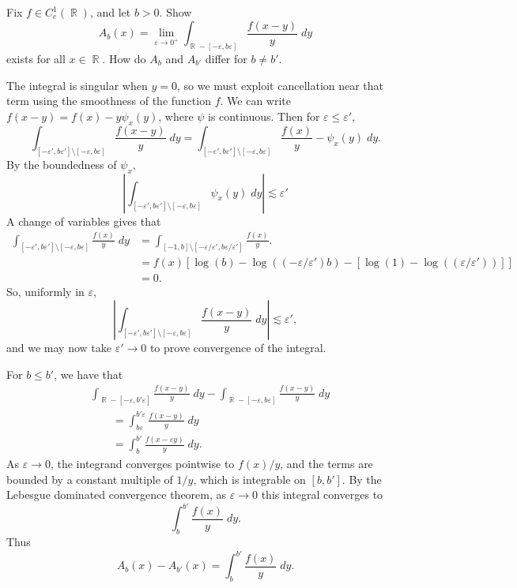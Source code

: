 \documentclass[answers]{exam}
\DeclareMathOperator{\RR}{\mathbb{R}}
\begin{document}
\begin{questions}
\question Fix $f \in C_c^1(\RR)$, and let $b > 0$. Show
%
\[ A_b(x) = \lim_{\varepsilon \to 0^+} \int_{\RR - [-\varepsilon,b\varepsilon]} \frac{f(x-y)}{y}\; dy \]
%
exists for all $x \in \RR$. How do $A_b$ and $A_{b'}$ differ for $b \neq b'$.
\begin{solution}
	The integral is singular when $y = 0$, so we must exploit cancellation near that term using the smoothness of the function $f$. We can write $f(x - y) = f(x) - y \psi_x(y)$, where $\psi$ is continuous. Then for $\varepsilon \leq \varepsilon'$,
	\[ \int_{[-\varepsilon',b \varepsilon'] \setminus [-\varepsilon,b \varepsilon]} \frac{f(x-y)}{y}\; dy = \int_{[-\varepsilon',b \varepsilon'] \setminus [-\varepsilon,b \varepsilon]} \frac{f(x)}{y} - \psi_x(y)\; dy. \]
	By the boundedness of $\psi_x$,
	\[ \left| \int_{[-\varepsilon',b \varepsilon'] \setminus [-\varepsilon,b \varepsilon]} \psi_x(y)\; dy \right| \lesssim \varepsilon' \]
	A change of variables gives that
	\begin{align*}
		\int_{[-\varepsilon',b \varepsilon'] \setminus [-\varepsilon,b \varepsilon]} \frac{f(x)}{y}\; dy &= \int_{[-1,b] \setminus [ -\varepsilon / \varepsilon', b \varepsilon / \varepsilon' ]} \frac{f(x)}{y}.\\
		&= f(x) [ \log(b) - \log( (-\varepsilon / \varepsilon') b ) - [\log(1) - \log((\varepsilon/\varepsilon'))] ]\\
		&= 0.
	\end{align*}
	So, uniformly in $\varepsilon$,
	\[ \left| \int_{[-\varepsilon',b \varepsilon'] \setminus [-\varepsilon,b \varepsilon]} \frac{f(x-y)}{y}\; dy \right| \lesssim \varepsilon', \]
	and we may now take $\varepsilon' \to 0$ to prove convergence of the integral.

	For $b \leq b'$, we have that
	\begin{align*}
		&\int_{\RR - [-\varepsilon,b'\varepsilon]} \frac{f(x-y)}{y}\; dy - \int_{\RR - [-\varepsilon,b\varepsilon]} \frac{f(x-y)}{y}\; dy\\
		&\quad\quad = \int_{b \varepsilon}^{b' \varepsilon} \frac{f(x-y)}{y}\; dy\\
		&\quad\quad = \int_b^{b'} \frac{f(x - \varepsilon y)}{y}\; dy.
	\end{align*}
	As $\varepsilon \to 0$, the integrand converges pointwise to $f(x) / y$, and the terms are bounded by a constant multiple of $1/y$, which is integrable on $[b,b']$. By the Lebesgue dominated convergence theorem, as $\varepsilon \to 0$ this integral converges to
	\[ \int_b^{b'} \frac{f(x)}{y}\; dy. \]
	Thus
	\[ A_b(x) - A_{b'}(x) = \int_b^{b'} \frac{f(x)}{y}\; dy.  \]
\end{solution}


\end{questions}
\end{document}
